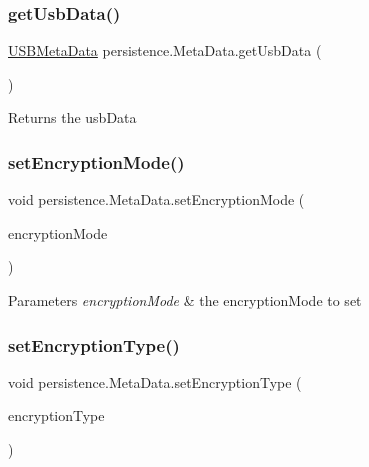 \subsubsection{\texorpdfstring{get\+Usb\+Data()}{getUsbData()}}
{\footnotesize\ttfamily \mbox{\hyperlink{classpersistence_1_1_u_s_b_meta_data}{U\+S\+B\+Meta\+Data}} persistence.\+Meta\+Data.\+get\+Usb\+Data (\begin{DoxyParamCaption}{ }\end{DoxyParamCaption})}

\begin{DoxyReturn}{Returns}
the usb\+Data 
\end{DoxyReturn}
\mbox{\label{classpersistence_1_1_meta_data_aff1f46dfd2331d522c642ca534af7fe1}} 
\subsubsection{\texorpdfstring{set\+Encryption\+Mode()}{setEncryptionMode()}}
{\footnotesize\ttfamily void persistence.\+Meta\+Data.\+set\+Encryption\+Mode (\begin{DoxyParamCaption}\item[{\mbox{\hyperlink{enumenums_1_1_encryption_mode}{Encryption\+Mode}}}]{encryption\+Mode }\end{DoxyParamCaption})}


\begin{DoxyParams}{Parameters}
{\em encryption\+Mode} & the encryption\+Mode to set \\
\hline
\end{DoxyParams}
\mbox{\label{classpersistence_1_1_meta_data_a7406483df8ef635af814afc53a6dcca6}} 
\subsubsection{\texorpdfstring{set\+Encryption\+Type()}{setEncryptionType()}}
{\footnotesize\ttfamily void persistence.\+Meta\+Data.\+set\+Encryption\+Type (\begin{DoxyParamCaption}\item[{\mbox{\hyperlink{enumenums_1_1_encryption_type}{Encryption\+Type}}}]{encryption\+Type }\end{DoxyParamCaption})}


